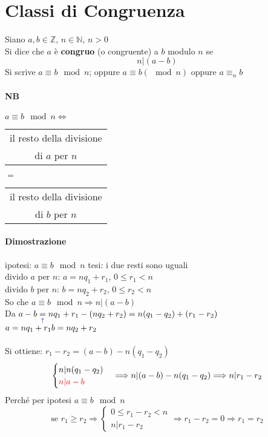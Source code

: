 \section{Classi di Congruenza}
Siano $a,b\in\mathbb{Z}$, $n\in\mathbb{N}$, $n>0$\\
Si dice che {\color{red} $a$ è \textbf{congruo} (o congruente) a $b$ modulo $n$ se}
$$n|(a-b)$$
Si scrive $a\equiv b\mod n$; oppure $a\equiv b (\mod n)$ oppure $a\equiv _n b$
\paragraph{NB} $a\equiv b\mod n \Longleftrightarrow$
\begin{tabular}{c}
    il resto della divisione\\
    di $a$ per $n$
\end{tabular}$=$
\begin{tabular}{c}
    il resto della divisione\\
    di $b$ per $n$
\end{tabular}
\paragraph{Dimostrazione} ipotesi: $a\equiv b\mod n$ tesi: i due resti sono uguali \\
divido $a$ per $n$: {\color{green} $a=nq_1+r_1$}, {\color{blue} $0\leq r_1<n$}\\
divido $b$ per $n$: {\color{green} $b=nq_2+r_2$}, {\color{blue} $0\leq r_2<n$}\\
So che $a\equiv b\mod n \Longrightarrow n|(a-b)$\\
Da $a-b\underset{{\color{blue}\uparrow}}{=}nq_1 +r_1-(nq_2+r_2)=n(q_1-q_2)+(r_1-r_2)$\\
{\color{blue} $a=nq_1+r_1\\ b=nq_2 +r_2$}\\\\
Si ottiene: $r_1-r_2=(a-b)-n(q_1-q_2)$
$$
\begin{cases}
    n|n(q_1-q_2)\\
    {\color{red} n|a-b}
\end{cases}
\Longrightarrow n| (a-b)-n(q_1-q_2)\Longrightarrow n|r_1-r_2
$$
{\color{red} Perché per ipotesi $a\equiv b\mod n$    }
$$
\textrm{se }r_1\geq r_2\Longrightarrow 
\begin{cases}
0\leq r_1-r_2<n\\
n|r_1-r_2
\end{cases}
\Longrightarrow 
r_1-r_2=0\Longrightarrow r_1=r_2
$$
        
